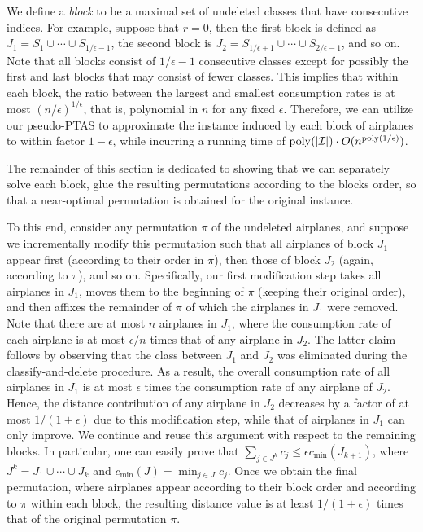 \documentclass[11pt]{article}
\theoremstyle{plain}
\theoremstyle{definition}
\newcommand{\poly}{\mathrm{poly}}
\begin{document}
We define a \textit{block} to be a maximal set of undeleted classes that have consecutive indices. For example, suppose that $r = 0$, then the first block is defined as $J_1 = S_1 \cup \cdots \cup S_{1 / \epsilon - 1}$, the second block is $J_2 = S_{1 / \epsilon + 1} \cup \cdots \cup S_{2 / \epsilon - 1}$, and so on. Note that all blocks consist of $1 / \epsilon - 1$ consecutive classes except for possibly the first and last blocks that may consist of  fewer classes. This implies that within each block, the ratio between the largest and smallest consumption rates is at most $(n / \epsilon)^{1 / \epsilon}$, that is, polynomial in $n$ for any fixed $\epsilon$. Therefore, we can utilize our pseudo-PTAS to approximate the instance induced by each block of airplanes to within factor $1 - \epsilon$, while incurring a running time of $\poly( |{\cal I}| ) \cdot O( n^{ \poly(1/\epsilon) } )$.

\smallskip {} The remainder of this section is dedicated to showing that we can separately solve each block, glue the resulting permutations according to the blocks order, so that a near-optimal permutation is obtained for the original instance.

To this end, consider any permutation $\pi$ of the undeleted airplanes, and suppose we incrementally modify this permutation such that all airplanes of block $J_1$ appear first (according to their order in $\pi$), then those of block $J_2$ (again, according to $\pi$), and so on. Specifically, our first modification step takes all airplanes in $J_1$, moves them to the beginning of $\pi$ (keeping their original order), and then affixes the remainder of $\pi$ of which the airplanes in $J_1$ were removed. Note that there are at most $n$ airplanes in $J_1$, where the consumption rate of each airplane is at most $\epsilon/n$ times that of any airplane in $J_2$. The latter claim follows by observing that the class between $J_1$ and $J_2$ was eliminated during the classify-and-delete procedure. As a result, the overall consumption rate of all airplanes in $J_1$ is at most $\epsilon$ times the consumption rate of any airplane of $J_2$. Hence, the distance contribution of any airplane in $J_2$ decreases by a factor of at most $1/(1+\epsilon)$ due to this modification step, while that of airplanes in $J_1$ can only improve. We continue and reuse this argument with respect to the remaining blocks. In particular, one can easily prove that $\sum_{j \in J^k} c_j \leq \epsilon c_{\min}(J_{k+1})$, where $J^k = J_1 \cup \cdots \cup J_k$ and $c_{\min}(J) = \min_{j \in J} c_j$. Once we obtain the final permutation, where airplanes appear according to their block order and according to $\pi$ within each block, the resulting distance value is at least $1/(1+\epsilon)$ times that of the original permutation $\pi$.
\end{document}
